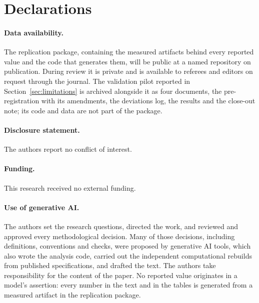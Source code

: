 \documentclass[11pt]{article}
\theoremstyle{definition}
\newif\ifanon
\begin{document}








\section*{Declarations}

\paragraph{Data availability.} The replication package, containing the measured artifacts behind
every reported value and the code that generates them, will be public at a named repository on
publication. During review it is private and is available to referees and editors on request
through the journal. The validation pilot reported in Section~\ref{sec:limitations} is archived
alongside it as four documents, the pre-registration with its amendments, the deviations log, the
results and the close-out note; its code and data are not part of the package.

\ifanon
\else
\paragraph{Disclosure statement.} The authors report no conflict of interest.
\paragraph{Funding.} This research received no external funding.
\fi

\paragraph{Use of generative AI.} The authors set the research questions, directed the work, and reviewed and approved every
methodological decision. Many of those decisions, including definitions, conventions and checks,
were proposed by generative AI tools, which also wrote the analysis code, carried out the
independent computational rebuilds from published specifications, and drafted the text. The
authors take responsibility for the content of the paper. No reported value originates in a
model's assertion: every number in the text and in the tables is generated from a measured
artifact in the replication package.
\end{document}
